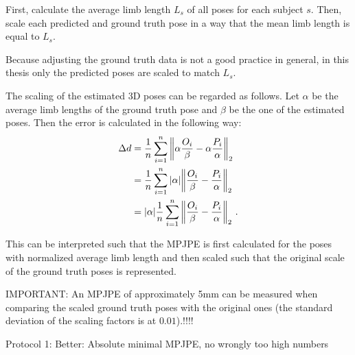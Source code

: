 First, calculate the average limb length $L_s$ of all poses for each subject $s$.
Then, scale each predicted and ground truth pose in a way that the mean limb length is equal to $L_s$.

Because adjusting the ground truth data is not a good practice in general, in this thesis only the predicted poses are scaled to match $L_s$.

The scaling of the estimated 3D poses can be regarded as follows. Let $\alpha$ be the average limb lengths of the ground truth pose and $\beta$ be the one of the estimated poses.
Then the error is calculated in the following way:
\begin{align}
	\Delta d &= \frac{1}{n} \sum_{i = 1}^{n}  \norm{\alpha \frac{O_i}{\beta} - \alpha \frac{P_i}{\alpha}}_2 \\
	&=  \frac{1}{n} \sum_{i = 1}^{n} \abs{\alpha} \norm{\frac{O_i}{\beta} -\frac{P_i}{\alpha}}_2 \\
	&=  \abs{\alpha} \frac{1}{n} \sum_{i = 1}^{n} \norm{\frac{O_i}{\beta} -\frac{P_i}{\alpha}}_2 \ .
	\label{eq:protocol2-mpjpe-scaling}
\end{align}

This can be interpreted such that the MPJPE is first calculated for the poses with normalized average limb length and then scaled such that the original scale of the ground truth poses is represented. 

IMPORTANT: An MPJPE of approximately 5mm can be measured when comparing the scaled ground truth poses with the original ones (the standard deviation of the scaling factors is at $0.01$).!!!!


Protocol 1: Better: Absolute minimal MPJPE, no wrongly too high numbers